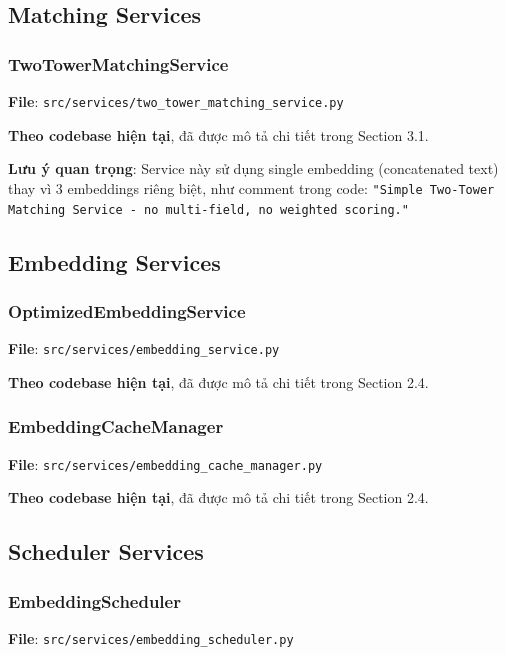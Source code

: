 \subsection{Matching Services}

\subsubsection{TwoTowerMatchingService}

\textbf{File}: \texttt{src/services/two\_tower\_matching\_service.py}

\textbf{Theo codebase hiện tại}, đã được mô tả chi tiết trong Section 3.1.

\textbf{Lưu ý quan trọng}: Service này sử dụng single embedding (concatenated text) thay vì 3 embeddings riêng biệt, như comment trong code: \texttt{"Simple Two-Tower Matching Service - no multi-field, no weighted scoring."}

\subsection{Embedding Services}

\subsubsection{OptimizedEmbeddingService}

\textbf{File}: \texttt{src/services/embedding\_service.py}

\textbf{Theo codebase hiện tại}, đã được mô tả chi tiết trong Section 2.4.

\subsubsection{EmbeddingCacheManager}

\textbf{File}: \texttt{src/services/embedding\_cache\_manager.py}

\textbf{Theo codebase hiện tại}, đã được mô tả chi tiết trong Section 2.4.

\subsection{Scheduler Services}

\subsubsection{EmbeddingScheduler}

\textbf{File}: \texttt{src/services/embedding\_scheduler.py}

